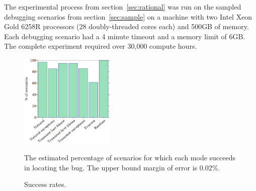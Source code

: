 
The experimental process from section~\ref{sec:rational} was run on the
sampled debugging scenarios from section~\ref{sec:sample} on a machine
with two Intel Xeon Gold 6258R processors (28 doubly-threaded cores each)
and 500GB of memory.  Each debugging scenario had a 4 minute timeout and a
memory limit of 6GB. The complete experiment required over 30,000 compute
hours.


\begin{figure}
  \includegraphics[width=0.40\textwidth]{./plots/success-bars}

  \vspace{1em}
  \begin{minipage}{0.4\textwidth}
  The estimated percentage of scenarios for which each mode succeeds in locating the bug.
  The upper bound margin of error is 0.02\%.
  \end{minipage}

  \caption{Success rates.}
  \label{fig:success-bars}
\end{figure}

